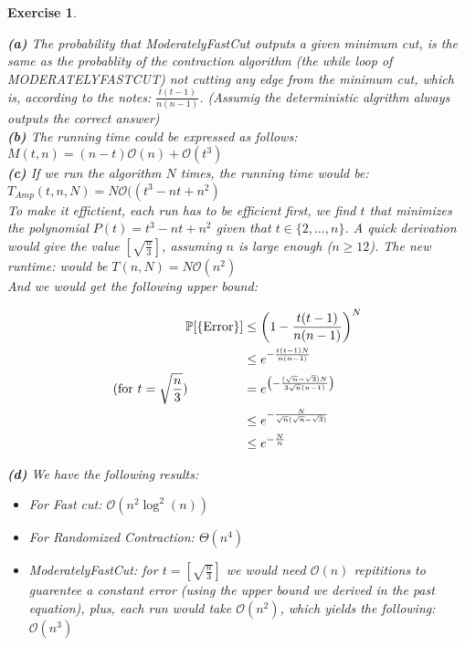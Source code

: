 \documentclass{article}
\newtheorem{exo}{Exercise}
\def\P{\mathbb{P}}
\begin{document}
\begin{exo}{\ \\}
    
\noindent
\textbf{(a)} The probability that ModeratelyFastCut outputs a given minimum cut, is the same as the probablity of the contraction algorithm (the while loop of MODERATELYFASTCUT) not cutting any edge from the minimum cut, which is, according to the notes: $\frac{t(t-1)}{n(n-1)}$. (Assumig the deterministic algrithm always outputs the correct answer) \\
 

\noindent
\textbf{(b)}  The running time could be expressed as follows: $M(t,n) = (n-t) \mathcal{O}(n) + \mathcal{O}(t^3)$ \\

\noindent
\textbf{(c)} If we run the algorithm $N$ times, the running time would be: $T_{Amp}(t,n,N) = N \mathcal{O}((t^3-nt+n^2)$ \\

To make it effictient, each run has to be efficient first, we find $t$ that minimizes the polynomial $P(t) = t^3 -nt + n^2$ given that $t \in \{2, \dots, n\}$. A quick derivation would give the value $[\sqrt{\frac{n}{3}}]$, assuming $n$ is large enough ($n \geq 12$). The new runtime: would be $T(n, N) = N \mathcal{O}(n^2)$ \\

And we would  get the following upper bound:

\begin{align*}
    \P[\text{\{Error\}}] &\leq \left(1 - \frac{t(t-1)}{n(n-1)}\right)^N \\
                                                    &\leq e^{-\frac{t(t-1)N}{n(n-1)} } \\
                                                   \text{(for $t = \sqrt{\frac{n}{3}}$) \quad \quad  \quad \quad} &= e^{\left(-\frac{(\sqrt{n}-\sqrt{3})N}{3\sqrt{n}(n-1)} \right)} \\
                                                                                                                  &\leq e^{-\frac{N}{\sqrt{n}(\sqrt{n}-\sqrt{3})} } \\
                                                                                                                  &\leq e^{-\frac{N}{n} }
\end{align*}

\noindent
\textbf{(d)}  We have the following results:
\begin{itemize}
    \item For Fast cut: $\mathcal{O}(n^2 \log^2(n))$ 
    \item For Randomized Contraction: $\Theta(n^4)$
    \item ModeratelyFastCut: for $t = [\sqrt{\frac{n}{3}}]$ we would need $\mathcal{O}(n)$ repititions to guarentee a constant error (using the upper bound we derived in the past equation), plus, each run would take $\mathcal{O}(n^2)$, which yields the following: $\mathcal{O}(n^3)$
\end{itemize}


\end{exo}
\end{document}
